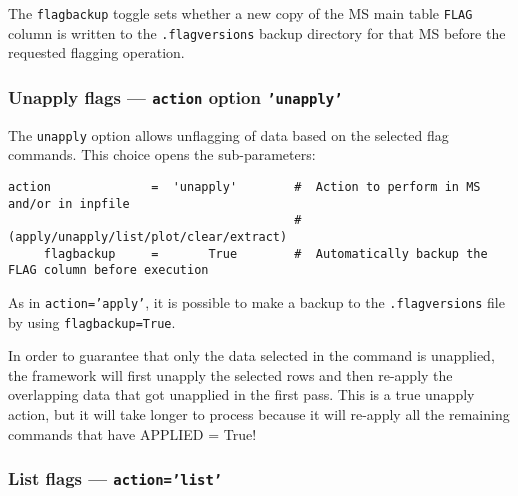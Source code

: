 The {\tt flagbackup} toggle sets whether a new copy of the MS main
table {\tt FLAG} column is written to the {\tt .flagversions} backup
directory for that MS before the requested flagging operation.


\subsubsection{Unapply flags --- {\tt action} option {\tt 'unapply'}}
\label{section:edit.flagcmd.action.unapply}

The {\tt unapply} option allows unflagging of data based on the selected flag commands.
This choice opens the sub-parameters:
\small
\begin{verbatim}
action              =  'unapply'        #  Action to perform in MS and/or in inpfile
                                        #   (apply/unapply/list/plot/clear/extract)
     flagbackup     =       True        #  Automatically backup the FLAG column before execution

\end{verbatim}
\normalsize

As in {\tt action='apply'}, it is possible to make a backup to the
{\tt *.flagversions} file by using {\tt flagbackup=True}.  

In order to guarantee that only the data selected in the command is
unapplied, the framework will first unapply the selected rows and then
re-apply the overlapping data that got unapplied in the first
pass. This is a true unapply action, but it will take longer to
process because it will re-apply all the remaining commands that have
APPLIED = True!


%



\subsubsection{List flags --- {\tt action='list'}}
\label{section:edit.flagcmd.action.list}

